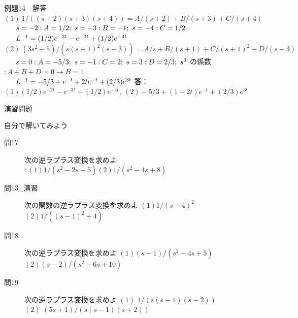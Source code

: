 \documentclass[professionalfonts]{beamer}
\begin{document}
\begin{frame}{例題14　解答}
  $(1)\ 1/((s+2)(s+3)(s+4)) = A/(s+2) + B/(s+3) + C/(s+4)$\\[4pt]
  $\hphantom{(1)\ }s=-2: A=1/2;\ s=-3: B=-1;\ s=-4: C=1/2$\\[4pt]
  $\hphantom{(1)\ }L^{-1} = (1/2)e^{-2t} - e^{-3t} + (1/2)e^{-4t}$\\[4pt]
  $(2)\ (3s^{2}+5)/(s(s+1)^{2}(s-3)) = A/s + B/(s+1) + C/(s+1)^{2} + D/(s-3)$\\[4pt]
  $\hphantom{(2)\ }s=0: A=-5/3;\ s=-1: C=2;\ s=3: D=2/3;\ s^{3}$ の係数 $: A+B+D=0 \to B=1$\\[4pt]
  $\hphantom{(2)\ }L^{-1} = -5/3 + e^{-t} + 2t e^{-t} + (2/3)e^{3t}$
  \medskip\textbf{答}：$(1) (1/2)e^{-2t} - e^{-3t} + (1/2)e^{-4t},\ (2) -5/3 + (1+2t)e^{-t} + (2/3)e^{3t}$
\end{frame}

\begin{frame}{演習問題}
  \begin{exampleblock}{自分で解いてみよう}
  \begin{description}
    \item[問17] 次の逆ラプラス変換を求めよ $: (1) 1/(s^{2}-2s+5) (2) 1/(s^{2}-4s+8)$
    \item[問13\_演習] 次の関数の逆ラプラス変換を求めよ
    $(1) 1/(s-4)^{2}$\\
    $(2) 1/((s-1)^{2}+4)$\\
    \item[問18] 次の逆ラプラス変換を求めよ
    $(1) (s-1)/(s^{2}-4s+5)$\\
    $(2) (s-2)/(s^{2}-6s+10)$\\
    \item[問19] 次の逆ラプラス変換を求めよ
    $(1)$ $1/(s(s-1)(s-2))$\\
    $(2)$ $(5s+1)/(s(s-1)(s+2))$\\
  \end{description}
  \end{exampleblock}
\end{frame}
\end{document}
